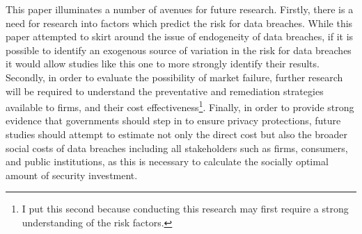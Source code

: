 \documentclass[../Main.tex]{subfiles}
\begin{document}
This paper illuminates a number of avenues for future research. Firstly, there is a need for research into factors which predict the risk for data breaches. While this paper attempted to skirt around the issue of endogeneity of data breaches, if it is possible to identify an exogenous source of variation in the risk for data breaches it would allow studies like this one to more strongly identify their results. Secondly, in order to evaluate the possibility of market failure, further research will be required to understand the preventative and remediation strategies available to firms, and their cost effectiveness\footnote{I put this second because conducting this research may first require a strong understanding of the risk factors.}. Finally, in order to provide strong evidence that governments should step in to ensure privacy protections, future studies should attempt to estimate not only the direct cost but also the broader social costs of data breaches including all stakeholders such as firms, consumers, and public institutions, as this is necessary to calculate the socially optimal amount of security investment.

\biblio %
\end{document}
